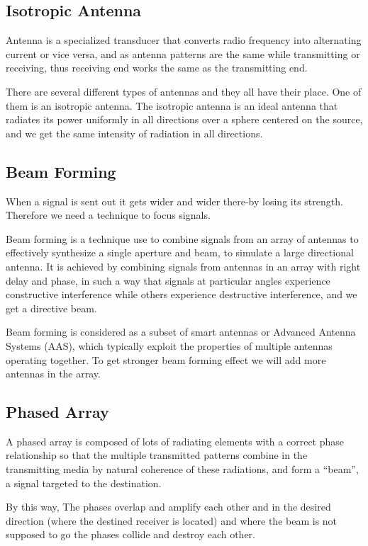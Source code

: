 \subsection{Isotropic Antenna}
Antenna is a specialized transducer that converts radio frequency into alternating current or vice versa, and as antenna patterns are the same while transmitting or receiving, thus receiving end works the same as the transmitting end.

There are several different types of antennas and they all have their place. One of them is an isotropic antenna. The isotropic antenna is an ideal antenna that radiates its power uniformly in all directions over a sphere centered on the source, and we get the same intensity of radiation in all directions.

\subsection{Beam Forming}

When a signal is sent out it gets wider and wider there-by losing its strength. Therefore we need a technique to focus signals.

Beam forming is a technique use to combine signals from an array of antennas to effectively synthesize a single aperture and beam, to simulate a large directional antenna. It is achieved by combining signals from antennas in an array with right delay and phase, in such a way that signals at particular angles experience constructive interference while others experience destructive interference, and we get a directive beam.

Beam forming is considered as a subset of smart antennas or Advanced Antenna Systems (AAS), which typically exploit the properties of multiple antennas operating together. To get stronger beam forming effect we will add more antennas in the array.

\subsection{Phased Array}

A phased array is composed of lots of radiating elements with a correct phase relationship so that the multiple transmitted patterns combine in the transmitting media by natural coherence of these radiations, and form a “beam”, a signal targeted to the destination.

By this way, The phases overlap and amplify each other and in the desired direction (where the destined receiver is located) and where the beam is not supposed to go the phases collide and destroy each other.

